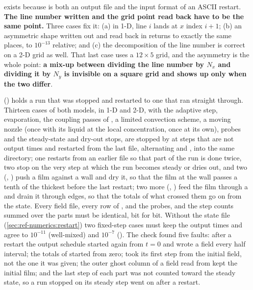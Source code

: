  exists because  is both an output
file and the input format of an ASCII restart. \textbf{The line number written
and the grid point read back have to be the same point.} Three cases fix it:
(a) in 1-D, line $i$ lands at $x$ index $i+1$; (b) an asymmetric shape written
out and read back in returns to exactly the same places, to $10^{-13}$
relative; and (c) the decomposition of the line number is correct on a 2-D grid
as well. That last case uses a \textbf{$12 \times 5$} grid, and the asymmetry is
the whole point: \textbf{a mix-up between dividing the line number by $N_x$ and
dividing it by $N_y$ is invisible on a square grid and shows up only when the
two differ}.

 () holds a
run that was stopped and restarted to one that ran straight through. Thirteen
cases of both models, in 1-D and 2-D, with the adaptive step, evaporation, the
coupling passes of , a limited convection scheme, a moving nozzle
(once with its liquid at the local concentration, once at its own),
probes and the steady-state and dry-out stops, are stopped by  at steps that
are not output times and restarted from the last file, alternating
 and , into the same directory; one restarts from
an earlier file so that part of the run is done twice, two stop on the very
step at which the run becomes steady or dries out, and two (,
) push a film against a  wall and dry it, so that
the film at the wall passes a tenth of the thickest before the last
restart; two more (, ) feed the film
through a  and drain it through  edges, so
that the totals of what crossed them go on from the state. Every field file, every row of
,  and the probes, and the step counts
summed over the parts must be identical, bit for bit. Without the state file
(\cref{sec:ref-numerics:restart}) two fixed-step cases must keep the output
times and agree to $10^{-11}$ (well-mixed) and $10^{-7}$ (). The
check found five faults: after a restart the output schedule started again
from $t = 0$ and wrote a field every half interval; the totals of
 started from zero;  took its first step from the
initial field, not the one it was given; the outer ghost column of a
 field read from  kept the initial film; and the
last step of each part was not counted toward the steady state, so a run
stopped on its steady step went on after a restart.

